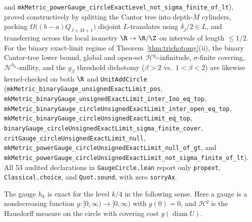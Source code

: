 and
\texttt{mkMetric\_\allowbreak powerGauge\_\allowbreak circleExactLevel\_\allowbreak not\_\allowbreak sigma\_\allowbreak finite\_\allowbreak of\_\allowbreak lt}),
proved constructively by splitting the Cantor tree into depth-$M$ cylinders,
packing $\Omega\bigl((b-a)Q_{J+M+1}\bigr)$ disjoint $L$-translates using
$\delta_j/2\in L$, and transferring across the local isometry
$\R\to\R/\Z$ on intervals of length $\le1/2$. For the binary exact-limit
regime of Theorem~\ref{thm:trichotomy}(ii), the binary Cantor-tree lower bound,
global and open-set $\mathcal H^{g_2}$-infinitude, $\sigma$-finite covering,
$\mathcal H^{h_k}$-nullity, and the $g_\beta$ threshold dichotomy ($\beta>2$ vs.\
$1<\beta<2$) are likewise kernel-checked on both $\R$ and \texttt{UnitAddCircle}
(\texttt{mkMetric\_\allowbreak binaryGauge\_\allowbreak unsigned\allowbreak ExactLimit\_\allowbreak pos},
\texttt{mkMetric\_\allowbreak binaryGauge\_\allowbreak unsigned\allowbreak ExactLimit\_\allowbreak inter\_\allowbreak Ioo\_\allowbreak eq\_\allowbreak top},
\texttt{mkMetric\_\allowbreak binaryGauge\_\allowbreak circle\allowbreak Unsigned\allowbreak ExactLimit\_\allowbreak inter\_\allowbreak open\_\allowbreak eq\_\allowbreak top},
\texttt{mkMetric\_\allowbreak binaryGauge\_\allowbreak circle\allowbreak Unsigned\allowbreak ExactLimit\_\allowbreak eq\_\allowbreak top},
\texttt{binaryGauge\_\allowbreak circle\allowbreak Unsigned\allowbreak ExactLimit\_\allowbreak sigma\_\allowbreak finite\_\allowbreak cover},
\texttt{critGauge\_\allowbreak circle\allowbreak Unsigned\allowbreak ExactLimit\_\allowbreak null},
\texttt{mkMetric\_\allowbreak powerGauge\_\allowbreak circle\allowbreak Unsigned\allowbreak ExactLimit\_\allowbreak null\_\allowbreak of\_\allowbreak gt},
and
\texttt{mkMetric\_\allowbreak powerGauge\_\allowbreak circle\allowbreak Unsigned\allowbreak ExactLimit\_\allowbreak not\_\allowbreak sigma\_\allowbreak finite\_\allowbreak of\_\allowbreak lt}).
All 53 audited declarations in \texttt{GaugeCircle.lean} report only
\texttt{propext}, \texttt{Classical.choice}, and \texttt{Quot.sound}, with zero
\texttt{sorryAx}.

The gauge $h_k$ is exact for the level $k/4$ in the following sense.
Here a gauge is a nondecreasing function $g:[0,\infty)\to[0,\infty)$
with $g(0)=0$, and $\mathcal H^g$ is the Hausdorff measure on the circle
with covering cost $g(\operatorname{diam}U)$.

